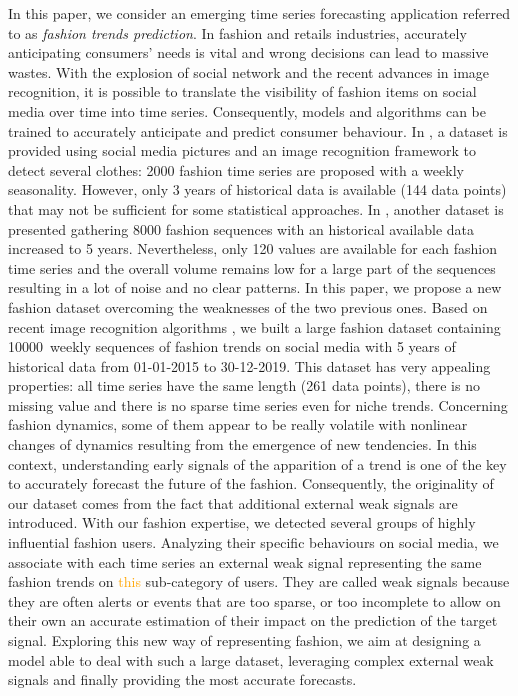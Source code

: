 \documentclass[10pt]{article} %
\newcommand{\numberts}{10000}
\begin{document}
In this paper, we consider an emerging time series forecasting application referred to as {\em fashion trends prediction}. In fashion and retails industries, accurately anticipating consumers' needs is vital and wrong decisions can lead to massive wastes. With the explosion of social network and the recent advances in image recognition, it is possible to translate the visibility of fashion items on social media over time into time series. Consequently, models and algorithms can be trained to accurately anticipate and predict consumer behaviour. In \citet{ma2020}, a dataset is provided using social media pictures and an image recognition framework to detect several clothes: 2000 fashion time series are proposed with a weekly seasonality. However, only 3 years of historical data is available (144 data points) that may not be sufficient for some statistical approaches. In \citet{ma2020}, another dataset is presented gathering 8000 fashion sequences with an historical available data  increased to 5 years. Nevertheless, only 120 values are available for each fashion time series and the overall volume remains low for a large part of the sequences resulting in a lot of noise and no clear patterns. In this paper, we propose a new fashion dataset overcoming the weaknesses of the two previous ones. Based on recent image recognition algorithms \citep{ren2015,chollet2017}, we built a large fashion dataset containing \numberts\ weekly sequences of fashion trends on social media with 5 years of historical data from 01-01-2015 to 30-12-2019. This dataset has very appealing properties:  all time series have the same length (261 data points), there is no missing value and there is no sparse time series even for niche trends. Concerning fashion dynamics, some of them appear to be really volatile with nonlinear changes of dynamics resulting from the emergence of new tendencies. In this context, understanding early signals of the apparition of a trend is one of the key to accurately forecast the future of the fashion. Consequently, the originality of our dataset comes from the fact that additional external weak signals are introduced. With our fashion expertise, we detected several groups of highly influential fashion users. Analyzing their specific behaviours on social media, we associate with each time series an external weak signal representing the same fashion trends on \textcolor{orange}{this} sub-category of users. They are called weak signals because they are often alerts or events that are too sparse, or too incomplete to allow on their own an accurate estimation of their impact on the prediction of the target signal. Exploring this new way of representing fashion, we aim at designing a model able to deal with such a large dataset, leveraging  complex external weak signals and finally providing the most accurate forecasts.
 
\end{document}
